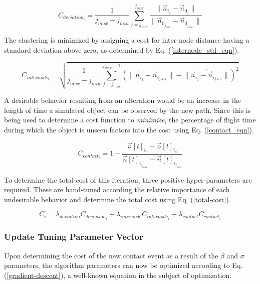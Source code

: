 \documentclass[conf]{new-aiaa}
\begin{document}
\begin{equation}
\label{path_deviation_eqn}
C_{deviation_i} = \frac{1}{j_{max} - j_{min}}\sum\limits_{j=j_{min}}^{j_{max}}\frac{\|\vec{n}_{i_j} - \vec{n}_{0_j}\|}{\|\vec{n}_{0_{j_{min}}} - \vec{n}_{0_{j_{max}}}\|}
\end{equation}

The clustering is minimized by assigning a cost for inter-node distance having a standard deviation above zero, as determined by Eq. (\ref{internode_std_eqn}).

\begin{equation}
\label{internode_std_eqn}
C_{internode_i} = \sqrt{\frac{1}{j_{max} - j_{min}}\sum\limits_{j=j_{min}}^{j_{max} - 1}\left(\|\vec{n}_{i_j} - \vec{n}_{i_{j + 1}}\| - \overline{\|\vec{n}_{i_j} - \vec{n}_{i_{j + 1}}\|}\right)^2}
\end{equation}

A desirable behavior resulting from an alteration would be an increase in the length of time a simulated object can be observed by the new path. Since this is being used to determine a cost function to \emph{minimize}, the percentage of flight time during which the object is unseen factors into the cost using Eq. (\ref{contact_eqn}).

\begin{equation}
\label{contact_eqn}
C_{contact_i} = 1 - \frac{\vec{o}[t]_{i_{e}} - \vec{o}[t]_{i_{s}}}{\vec{n}[t]_{i_{j_{max}}} - \vec{n}[t]_{i_{j_{min}}}}
\end{equation}

To determine the total cost of this iteration, three positive hyper-parameters are required. These are hand-tuned according the relative importance of each undesirable behavior and determine the total cost using Eq. (\ref{total-cost}).

\begin{equation}
\label{total-cost}
C_i = \lambda_{deviation}C_{deviation_i} + \lambda_{internode}C_{internode_i} + \lambda_{contact}C_{contact_i}
\end{equation}


\subsubsection{Update Tuning Parameter Vector}
Upon determining the cost of the new contact event as a result of the $\beta$ and $\sigma$ parameters, the algorithm parameters can now be optimized according to Eq. (\ref{gradient-descent}),  a well-known equation in the subject of optimization.
\end{document}
